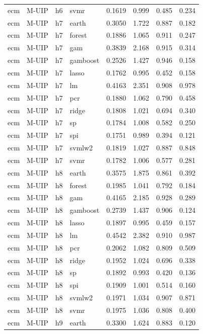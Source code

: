 \begin{ThreePartTable}
\begin{longtable}[t]{llclcccc}
ecm & M-UIP & h6 & svmr & 0.1619 & 0.999 & 0.485 & 0.234\\
\addlinespace
ecm & M-UIP & h7 & earth & 0.3050 & 1.722 & 0.887 & 0.182\\
ecm & M-UIP & h7 & forest & 0.1886 & 1.065 & 0.911 & 0.247\\
ecm & M-UIP & h7 & gam & 0.3839 & 2.168 & 0.915 & 0.314\\
ecm & M-UIP & h7 & gamboost & 0.2526 & 1.427 & 0.946 & 0.158\\
ecm & M-UIP & h7 & lasso & 0.1762 & 0.995 & 0.452 & 0.158\\
ecm & M-UIP & h7 & lm & 0.4163 & 2.351 & 0.908 & 0.978\\
ecm & M-UIP & h7 & pcr & 0.1880 & 1.062 & 0.790 & 0.458\\
ecm & M-UIP & h7 & ridge & 0.1808 & 1.021 & 0.694 & 0.340\\
ecm & M-UIP & h7 & sp & 0.1784 & 1.008 & 0.582 & 0.250\\
ecm & M-UIP & h7 & spi & 0.1751 & 0.989 & 0.394 & 0.121\\
ecm & M-UIP & h7 & svmlw2 & 0.1819 & 1.027 & 0.887 & 0.848\\
ecm & M-UIP & h7 & svmr & 0.1782 & 1.006 & 0.577 & 0.281\\
\addlinespace
ecm & M-UIP & h8 & earth & 0.3575 & 1.875 & 0.861 & 0.392\\
ecm & M-UIP & h8 & forest & 0.1985 & 1.041 & 0.792 & 0.184\\
ecm & M-UIP & h8 & gam & 0.4165 & 2.185 & 0.928 & 0.289\\
ecm & M-UIP & h8 & gamboost & 0.2739 & 1.437 & 0.906 & 0.124\\
ecm & M-UIP & h8 & lasso & 0.1897 & 0.995 & 0.459 & 0.157\\
ecm & M-UIP & h8 & lm & 0.4542 & 2.382 & 0.910 & 0.987\\
ecm & M-UIP & h8 & pcr & 0.2062 & 1.082 & 0.809 & 0.509\\
ecm & M-UIP & h8 & ridge & 0.1952 & 1.024 & 0.696 & 0.338\\
ecm & M-UIP & h8 & sp & 0.1892 & 0.993 & 0.420 & 0.136\\
ecm & M-UIP & h8 & spi & 0.1909 & 1.001 & 0.514 & 0.160\\
ecm & M-UIP & h8 & svmlw2 & 0.1971 & 1.034 & 0.907 & 0.871\\
ecm & M-UIP & h8 & svmr & 0.1975 & 1.036 & 0.808 & 0.400\\
\addlinespace
ecm & M-UIP & h9 & earth & 0.3300 & 1.624 & 0.883 & 0.120\\

\end{longtable}
\end{ThreePartTable}
